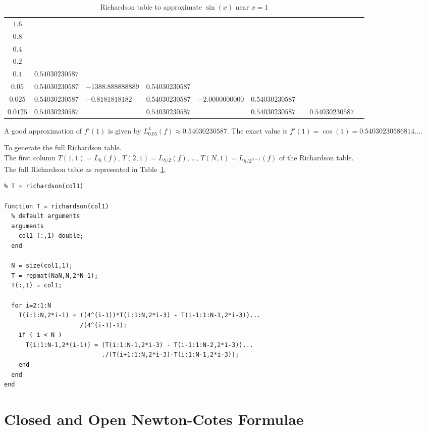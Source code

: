 \begin{egg}
\begin{table}
\begin{sideways}
\begin{tabular}{c|llllllll}
\hline
$1.6$ && && && && \\
$0.8$ && && && && \\
$0.4$ && && && && \\
$0.2$ && && && && \\
$0.1$ & $0.54030230587$ & && && && \\
$0.05$ & $0.54030230587$ & $-1388.888888889$ & $0.54030230587$ & && && \\
$0.025$ & $0.54030230587$ & $-0.8181818182$ & $0.54030230587$ &
$-2.0000000000$ & $0.54030230587$ & && \\
$0.0125$ & $0.54030230587$ & & $0.54030230587$ & & $0.54030230587$
& & $0.54030230587$ &
\end{tabular}
\end{sideways}
\caption{Richardson table to approximate $\sin(x)$ near
$x=1$}\label{rich_comp}
\end{table}

A good approximation of $f'(1)$ is given by
$L_{0.05}^4(f) \approx 0.54030230587$.  The exact value is
$f'(1) = \cos(1) = 0.54030230586814\ldots$.
\end{egg}

\begin{code}
To generate the full Richardson table. \\
 The first column $T(1,1) = L_h(f)$, $T(2,1)= L_{h/2}(f)$,
\ldots, $T(N,1) = L_{h/2^{N-1}}(f)$ of the Richardson table.\\
 The full Richardson table as represented in
Table~\ref{rich_comp}.
\small
\begin{verbatim}
% T = richardson(col1)

function T = richardson(col1)
  % default arguments
  arguments
    col1 (:,1) double;
  end

  N = size(col1,1);
  T = repmat(NaN,N,2*N-1);
  T(:,1) = col1;
    
  for i=2:1:N
    T(i:1:N,2*i-1) = ((4^(i-1))*T(i:1:N,2*i-3) - T(i-1:1:N-1,2*i-3))...
                     /(4^(i-1)-1);
    if ( i < N )
      T(i:1:N-1,2*(i-1)) = (T(i:1:N-1,2*i-3) - T(i-1:1:N-2,2*i-3))...
                           ./(T(i+1:1:N,2*i-3)-T(i:1:N-1,2*i-3));
    end
  end
end
\end{verbatim}
\end{code}

\section{Closed and Open Newton-Cotes Formulae}

